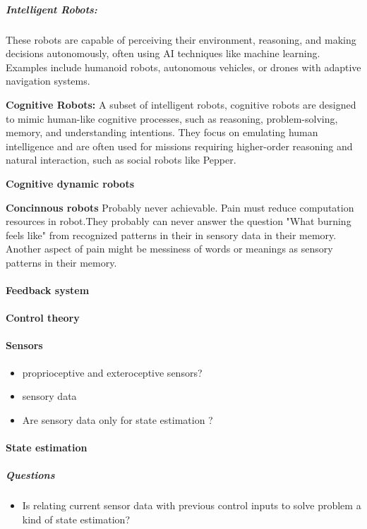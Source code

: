\documentclass{book}
\begin{document}
    \subparagraph{Intelligent Robots:} These robots are capable of perceiving their environment, reasoning, and making decisions autonomously, often using AI techniques like machine learning. Examples include humanoid robots, autonomous vehicles, or drones with adaptive navigation systems. 

        \textbf{Cognitive Robots:} A subset of intelligent robots, cognitive robots are designed to mimic human-like cognitive processes, such as reasoning, problem-solving, memory, and understanding intentions. They focus on emulating human intelligence and are often used for missions requiring higher-order reasoning and natural interaction, such as social robots like Pepper.

        \textbf{Cognitive dynamic robots}

        \textbf{Concinnous robots}
        Probably never achievable. Pain must reduce computation resources in robot.They probably can never answer the question "What burning feels like" from recognized patterns in their in sensory data in their memory. Another aspect of pain might be messiness of words or meanings as sensory patterns in their memory.

\paragraph{Feedback system}

\paragraph{Control theory}

\paragraph{Sensors}
    \begin{itemize}
        \item proprioceptive and exteroceptive sensors?
        \item sensory data
        \item Are sensory data only for state estimation ?
    \end{itemize}

\paragraph{State estimation}
    \subparagraph{Questions}
        \begin{itemize}
            \item Is relating current sensor data with previous control inputs to solve problem a kind of state estimation?
        \end{itemize}
    
\end{document}
